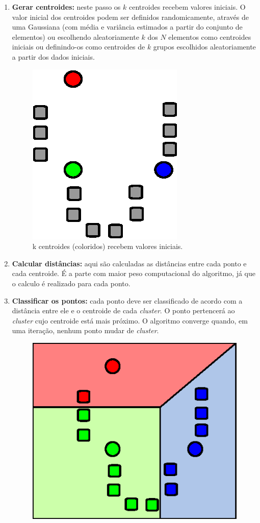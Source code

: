 \begin{enumerate}
  \item \textbf{Gerar centroides:} neste passo os \(k\) centroides recebem valores iniciais. O valor inicial dos centroides podem ser definidos randomicamente, através de uma Gaussiana (com média e variância estimados a partir do conjunto de elementos) ou escolhendo aleatoriamente \(k\) dos \(N\) elementos como centroides iniciais ou definindo-os como centroides de \(k\) grupos escolhidos aleatoriamente a partir dos dados iniciais.
  \begin{figure}[h]
    \centering
    \includegraphics[scale=0.6]{figuras/kmeans-1.eps}
    \caption{k centroides (coloridos) recebem valores iniciais.}
  \end{figure}
  \item \textbf{Calcular distâncias:} aqui são calculadas as distâncias entre cada ponto e cada centroide. É a parte com maior peso computacional do algoritmo, já que o calculo é realizado para cada ponto.
  \item \textbf{Classificar os pontos:} cada ponto deve ser classificado de acordo com a distância entre ele e o centroide de cada \textit{cluster}. O ponto pertencerá ao \textit{cluster} cujo centroide está mais próximo. O algoritmo converge quando, em uma iteração, nenhum ponto mudar de \textit{cluster}.
  \begin{figure}[h]
    \centering
    \includegraphics[scale=0.6]{figuras/kmeans-2.eps}

\end{figure}
\end{enumerate}
